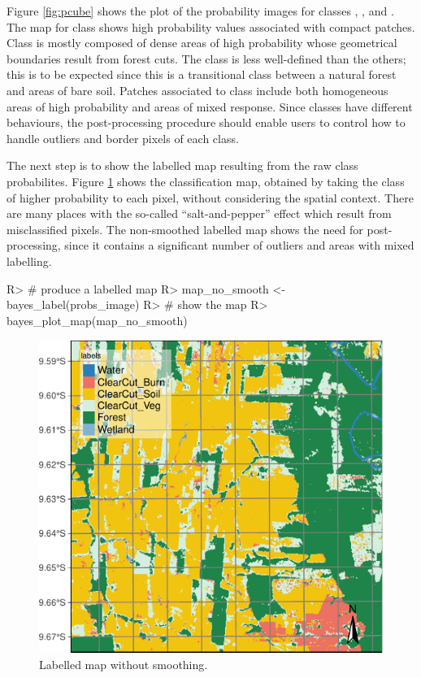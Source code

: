\documentclass[
  shortnames]{jss}
\begin{document}
Figure \ref{fig:pcube} shows the plot of the probability images for classes , ,  and . The map for class  shows high probability values associated with compact patches. Class  is mostly composed of dense areas of high probability whose geometrical boundaries result from forest cuts. The class  is less well-defined than the others; this is to be expected since this is a transitional class between a natural forest and areas of bare soil. Patches associated to class  include both homogeneous areas of high probability and areas of mixed response. Since classes have different behaviours, the post-processing procedure should enable users to control how to handle outliers and border pixels of each class.

The next step is to show the labelled map resulting from the raw class probabilites. Figure \ref{fig:map1} shows the classification map, obtained by taking the class of higher probability to each pixel, without considering the spatial context. There are many places with the so-called ``salt-and-pepper'' effect which result from misclassified pixels. The non-smoothed labelled map shows the need for post-processing, since it contains a significant number of outliers and areas with mixed labelling.

\begin{CodeChunk}
\begin{CodeInput}
R> # produce a labelled map
R> map_no_smooth <- bayes_label(probs_image)
R> # show the map
R> bayes_plot_map(map_no_smooth)
\end{CodeInput}
\begin{figure}[h]

{\centering \includegraphics{Bayesian_smoothing_JSS_files/figure-latex/map1-1} 

}

\caption[Labelled map without smoothing]{Labelled map without smoothing.}\label{fig:map1}
\end{figure}
\end{CodeChunk}
\end{document}
